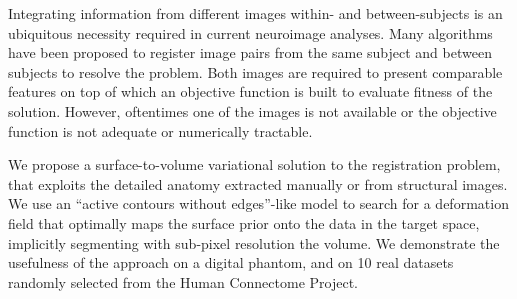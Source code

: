 Integrating information from different images within- and between-subjects
  is an ubiquitous necessity required in current neuroimage analyses.
Many algorithms have been proposed to register image pairs from the same
  subject and between subjects to resolve the problem.
Both images are required to present comparable features on top of which
  an objective function is built to evaluate fitness of the solution.
However, oftentimes one of the images is not available or the objective
  function is not adequate or numerically tractable.

We propose a surface-to-volume variational solution to the registration problem,
  that exploits the detailed anatomy extracted manually or from structural images.
We use an ``active contours without edges''-like model to search for a
  deformation field that optimally maps the surface prior onto the data
  in the target space, implicitly segmenting with sub-pixel resolution the
  volume.
We demonstrate the usefulness of the approach on a digital phantom, and on
  10 real datasets randomly selected from the Human Connectome Project.
